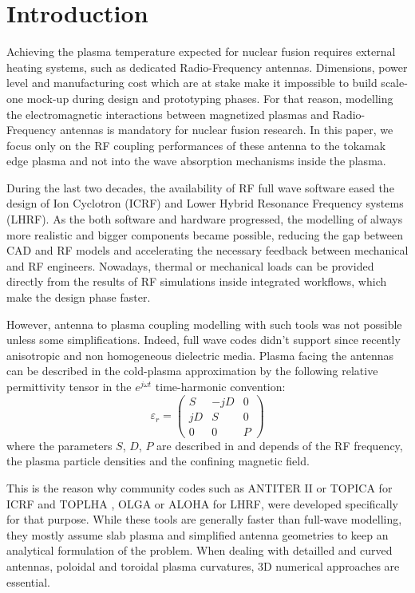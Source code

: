 \documentclass[preprint,3p,twocolumn]{elsarticle}
\begin{document}
\linenumbers

\section{Introduction}
Achieving the plasma temperature expected for nuclear fusion requires external heating systems, such as dedicated Radio-Frequency antennas. Dimensions, power level and manufacturing cost which are at stake make it impossible to build scale-one mock-up during design and prototyping phases. For that reason, modelling the electromagnetic interactions between magnetized plasmas and Radio-Frequency antennas is mandatory for nuclear fusion research. In this paper, we focus only on the RF coupling performances of these antenna to the tokamak edge plasma and not into the wave absorption mechanisms inside the plasma. 

During the last two decades, the availability of RF full wave software eased the design of Ion Cyclotron ({ICRF}) and Lower Hybrid Resonance Frequency systems ({LHRF}). As the both software and hardware progressed, the modelling of always more realistic and bigger components became possible, reducing the gap between CAD and RF models and accelerating the necessary feedback between mechanical and RF engineers. Nowadays, thermal or mechanical loads can be provided directly from the results of RF simulations inside integrated workflows, which make the design phase faster.

However, antenna to plasma coupling modelling with such tools was not possible unless some simplifications. Indeed, full wave codes didn't support since recently anisotropic and non homogeneous dielectric media. Plasma facing the antennas can be described in the cold-plasma approximation by the following relative permittivity tensor in the $e^{j\omega t}$ time-harmonic convention:
\begin{equation}
\varepsilon_r 
=
\left(
\begin{array}{ccc}
S & -jD & 0 \\
jD & S & 0 \\
0 & 0 & P
\end{array}
\right)
\end{equation}
where the parameters $S$, $D$, $P$ are described in \cite{Stix1992} and depends of the RF frequency, the plasma particle densities and the confining magnetic field. 

This is the reason why community codes such as {ANTITER II} \cite{Messiaen2011} or {TOPICA} \cite{Lancellotti2006} for {ICRF} and {TOPLHA} \cite{Milanesio2012}, {OLGA} \cite{Preinhaelter2017} or {ALOHA} \cite{Hillairet2010a} for LHRF, were developed specifically for that purpose. While these tools are generally faster than full-wave modelling, they mostly assume slab plasma and simplified antenna geometries to keep an analytical formulation of the problem. When dealing with detailled and curved antennas, poloidal and toroidal plasma curvatures, 3D numerical approaches are essential.  
\end{document}
